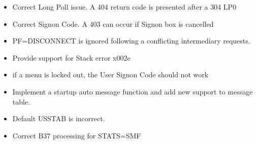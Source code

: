 \documentclass[letterpaper,10pt,english]{sphinxmanual}
\begin{document}
\begin{itemize}
\item {} 
Correct Long Poll issue. A 404 return code is presented after a 304 LP0

\end{itemize}

\begin{itemize}
\item {} 
Correct Signon Code. A 403 can occur if Signon box is cancelled

\end{itemize}

\begin{itemize}
\item {} 
PF=DISCONNECT is ignored following a conflicting intermediary requests.

\end{itemize}

\begin{itemize}
\item {} 
Provide support for Stack error x002e

\end{itemize}

\begin{itemize}
\item {} 
if a menu is locked out, the User Signon Code should not work

\end{itemize}

\begin{itemize}
\item {} 
Implement a startup auto message function and add new support to message table.

\end{itemize}

\begin{itemize}
\item {} 
Default USSTAB is incorrect.

\end{itemize}

\begin{itemize}
\item {} 
Correct B37 processing for STATS=SMF

\end{itemize}
\end{document}
